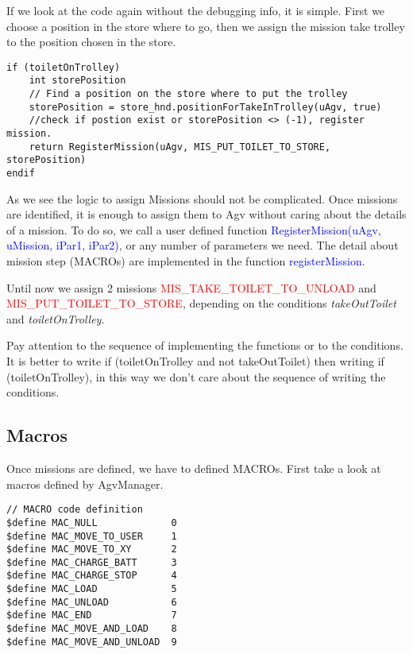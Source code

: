 If we look at the code again without the debugging info, it is simple. First we choose a position in the store where to go, then we assign the mission take trolley to the position chosen in the store.

\begin{lstlisting}[caption= Mission take full trolley to a postion in the store]
if (toiletOnTrolley)
	int storePosition
	// Find a position on the store where to put the trolley
	storePosition = store_hnd.positionForTakeInTrolley(uAgv, true)
	//check if postion exist or storePosition <> (-1), register mission.
	return RegisterMission(uAgv, MIS_PUT_TOILET_TO_STORE, storePosition)
endif
\end{lstlisting} 

As we see the logic to assign Missions should not be complicated. Once missions are identified, it is enough to assign them to Agv without caring about the details of a mission. To do so, we call a user defined function \textcolor{blue}{ RegisterMission(uAgv, uMission, iPar1, iPar2)}, or any number of parameters we need. The detail about mission step (MACROs) are implemented in the function \textcolor{blue}{registerMission}.

Until now we assign 2 missions \textcolor{red}{MIS\_TAKE\_TOILET\_TO\_UNLOAD} and  \textcolor{red}{MIS\_PUT\_TOILET\_TO\_STORE}, depending on the conditions \textit{takeOutToilet} and \textit{toiletOnTrolley}.

Pay attention to the sequence of implementing the functions or to the conditions. It is better to write if (toiletOnTrolley and not takeOutToilet) then writing if (toiletOnTrolley), in this way we don't care about the sequence of writing the conditions.



%
\subsection{Macros}
Once missions are defined, we have to defined MACROs. First take a look at macros defined by AgvManager.

\begin{lstlisting}[caption= MACRO defined in AgvManager]
// MACRO code definition
$define MAC_NULL             0
$define MAC_MOVE_TO_USER     1
$define MAC_MOVE_TO_XY       2
$define MAC_CHARGE_BATT      3
$define MAC_CHARGE_STOP      4
$define MAC_LOAD             5
$define MAC_UNLOAD           6
$define MAC_END              7
$define MAC_MOVE_AND_LOAD    8
$define MAC_MOVE_AND_UNLOAD  9
\end{lstlisting}

